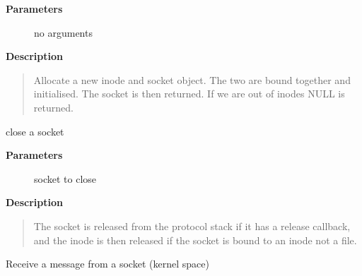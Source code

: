 \documentclass[a4paper,8pt,english]{sphinxmanual}
\begin{document}
\textbf{Parameters}
\begin{description}
\item[{}] \leavevmode
no arguments

\end{description}

\textbf{Description}
\begin{quote}

Allocate a new inode and socket object. The two are bound together
and initialised. The socket is then returned. If we are out of inodes
NULL is returned.
\end{quote}

\begin{fulllineitems}
\label{networking/kapi:c.sock_release}
close a socket

\end{fulllineitems}


\textbf{Parameters}
\begin{description}
\item[{}] \leavevmode
socket to close

\end{description}

\textbf{Description}
\begin{quote}

The socket is released from the protocol stack if it has a release
callback, and the inode is then released if the socket is bound to
an inode not a file.
\end{quote}

\begin{fulllineitems}
\label{networking/kapi:c.kernel_recvmsg}
Receive a message from a socket (kernel space)

\end{fulllineitems}
\end{document}
